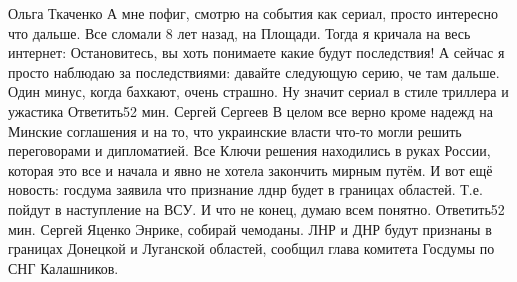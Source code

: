 \begin{itemize}
Ольга Ткаченко
А мне пофиг, смотрю на события как сериал, просто интересно что дальше. Все сломали 8 лет назад, на Площади. Тогда я кричала на весь интернет: Остановитесь, вы хоть понимаете какие будут последствия!
А сейчас я просто наблюдаю за последствиями: давайте следующую серию, че там дальше.
Один минус, когда бахкают, очень страшно. Ну значит сериал в стиле триллера и ужастика
Ответить52 мин.
Сергей Сергеев
В целом все верно кроме надежд на Минские соглашения и на то, что украинские власти что-то могли решить переговорами и дипломатией. Все Ключи решения находились в руках России, которая это все и начала и явно не хотела закончить мирным путём.
И вот ещё новость: госдума заявила что признание лднр будет в границах областей. Т.е. пойдут в наступление на ВСУ. И что не конец, думаю всем понятно.
Ответить52 мин.
Сергей Яценко
Энрике, собирай чемоданы. ЛНР и ДНР будут признаны в границах Донецкой и Луганской областей, сообщил глава комитета Госдумы по СНГ Калашников.

\end{itemize} %

